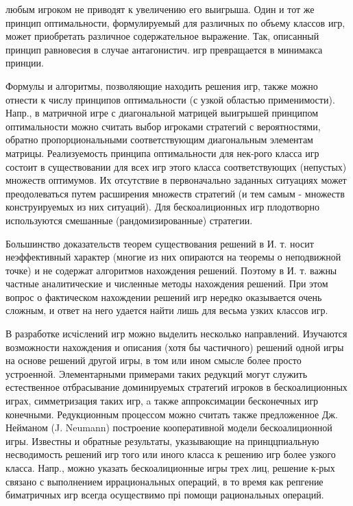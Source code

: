 \documentclass[10pt]{article}
\begin{document}
любым игроком не приводят $к$ увеличению его выигрыша. Один и тот же принцип оптимальности, формулируемый для различных по объему классов игр, может приобретать различное содержательное выражение. Так, описанный принцип равновесия в случае антагонистич. игр превращается в минимакса принции.



Формулы и алгоритмы, позволяющие находить решения игр, также можно отнести к числу принципов оптимальности (с узкой областью применимости). Напр., в матричной игре с диагональной матрицей выигрышей принципом оптимальности можно считать выбор игроками стратегий с вероятностями, обратно пропорциональными соответствующим диагональным элементам матрицы. Реализуемость принципа оптимальности для нек-рого класса игр состоит в существовании для всех игр этого класса соответствующих (непустых) множеств оптимумов. Их отсутствие в первоначально заданных ситуациях может преодолеваться путем расширения множеств стратегий (и тем самым - множеств конструируемых из них ситуаций). Для бескоалиционных игр плодотворно используются смешанные (рандомизированные) стратегии.



Большинство доказательств теорем существования решений в И. т. носит неэффективный характер (многие из них опираются на теоремы о неподвижной точке) и не содержат алгоритмов нахождения решений. Поэтому в И. т. важны частные аналитические и численные методы нахождения решений. При этом вопрос о фактическом нахождении решений игр нередко оказывается очень сложным, и ответ на него удается найти лишь для весьма узких классов игр.



В разработке исчіслений игр можно выделить несколько направлений. Изучаются возможности нахождения и описания (хотя бы частичного) решений одной игры на основе решений другой игры, в том или ином смысле более просто устроенной. Элементарными примерами таких редукций могут служить естественное отбрасывание доминируемых стратегий игроков в бескоалиционных играх, симметризация таких игр, a также аппроксимации бесконечных игр конечными. Редукционным процессом можно считать также предложенное Дж. Нейманом (J. Neumann) построение кооперативной модели бескоалиционной игры. Известны и обратные результаты, указывающие на принццпиальную несводимость решений игр того или иного класса к решению игр более узкого класса. Напр., можно указать бескоалиционные игры трех лиц, решение к-рых связано с выполнением иррациональных операций, в то время как репгение биматричных игр всегда осуществимо прі помощи рациональных операций.
\end{document}
